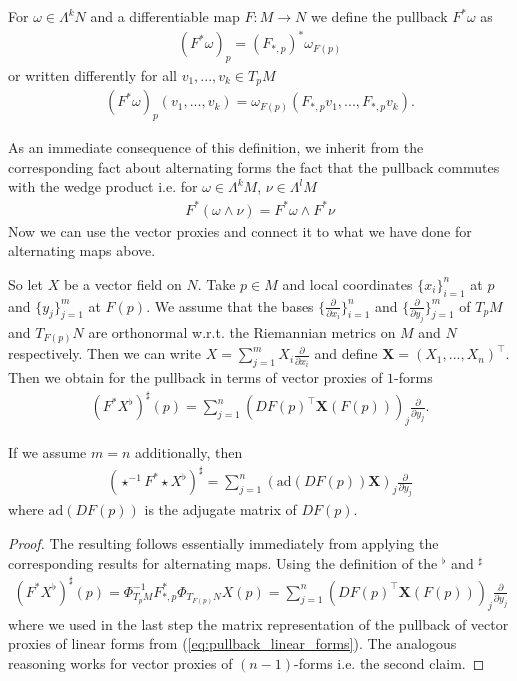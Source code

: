 \documentclass[../master_thesis.tex]{subfiles}
\begin{document}
\begin{definition}
    For $\omega \in \Lambda^k N$ and a differentiable map $F:M \rightarrow N$ 
    we define the pullback $F^*\omega$ as
    \begin{align*}
        (F^*\omega)_p = (F_{*,p})^* \omega_{F(p)}
    \end{align*}
    or written differently for all $v_1,...,v_k \in T_p M$
    \begin{align*}
        (F^*\omega)_p (v_1,...,v_k) = \omega_{F(p)}(F_{*,p} v_1, ..., F_{*,p} v_k).
    \end{align*}
\end{definition}
As an immediate consequence of this definition, we inherit from the corresponding fact about alternating forms
the fact that 
the pullback commutes with the wedge product i.e. for $\omega \in \Lambda^k M$, 
$\nu \in \Lambda^{l} M$
\begin{align*}
    F^*(\omega \wedge \nu ) = F^* \omega \wedge F^* \nu
\end{align*}
Now we can use the vector proxies and connect it to what we have done 
for alternating maps above. 
\begin{proposition}\label{prop:pullback_vector_fields}
    So let $X$ be a vector field on $N$. Take $p \in M$ and local coordinates
    $\{x_i\}_{i=1}^n$ at $p$ and $\{y_j\}_{j=1}^m$ at $F(p)$. We assume that the bases
    $\{ \frac{\partial}{\partial x_i} \}_{i=1}^n$ and 
    $\{ \frac{\partial}{\partial y_j} \}_{j=1}^m$ of $T_p M$ and $T_{F(p)} N$ 
    are orthonormal w.r.t. the Riemannian metrics
    on $M$ and $N$ respectively. 
    Then we can write $X = \sum_{j=1}^m X_i \frac{\partial}{\partial x_i}$
    and define $\mathbf{X} = (X_1,..., X_n)^\top$.
    Then we obtain for the pullback in terms of
    vector proxies of $1$-forms
    \begin{align*}
        (F^* X^\flat)^\sharp(p)
        = \sum_{j=1}^n (DF(p)^\top \mathbf{X}(F(p)))_j \frac{\partial}{\partial y_j}.
    \end{align*}

    If we assume $m=n$ additionally, then 
    \begin{align*}
        (\star^{-1} F^* \star X^\flat)^\sharp 
        = \sum_{j=1}^n (\text{ad}(DF(p)) \mathbf{X})_j \frac{\partial}{\partial y_j}
    \end{align*}
    where $\text{ad}(DF(p))$ is the adjugate matrix of $DF(p)$.
\end{proposition}
\begin{proof}
    The resulting follows essentially immediately from applying the 
    corresponding results for alternating maps. Using the definition of 
    the $^\flat$ and $^\sharp$
    \begin{align*}
        (F^* X^\flat)^\sharp(p)
        = \Phi^{-1}_{T_p M} F_{*,p}^* \Phi_{T_{F(p)}N} X(p)
        = \sum_{j=1}^n (DF(p)^\top \mathbf{X}(F(p)))_j \frac{\partial}{\partial y_j}
    \end{align*}
    where we used in the last step the matrix representation of the pullback of vector proxies
    of linear forms from (\ref{eq:pullback_linear_forms}). The analogous reasoning works 
    for vector proxies of $(n-1)$-forms i.e. the second claim.
\end{proof}
\end{document}
